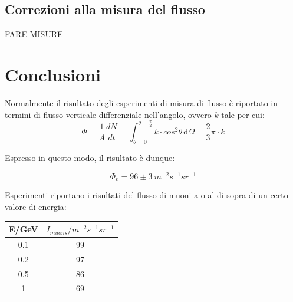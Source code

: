 \documentclass[11pt]{article}
\begin{document}
\begin{flushleft}
\subsection{Correzioni alla misura del flusso}
FARE MISURE

\section{Conclusioni}
Normalmente il risultato degli esperimenti di misura di flusso è riportato in termini di flusso verticale differenziale nell'angolo, ovvero $k$ tale per cui:
\begin{equation}
\Phi = \frac{1}{A}\frac{dN}{dt}=\int_{\theta=0}^{\theta=\frac{\pi}{2}}  \! k\cdot cos^2{\theta} \, \mathrm{d}\Omega = \frac{2}{3}\pi\cdot k
\end{equation}

Espresso in questo modo, il risultato è dunque:

\begin{equation}
\Phi_v = 96 \pm 3 \ m^{-2}s^{-1} sr^{-1}
\end{equation}





Esperimenti\cite{Flusso_NPL} riportano i risultati del flusso di muoni a o al di sopra di un certo valore di energia: \\
\vspace{0.8 cm}
\begin{tabular}{|c|c|}
\hline 
E/GeV & $I_{muons}/m^{-2} s^{-1} sr^{-1}$ \\ 
\hline 
0.1 & 99 \\ 
\hline 
0.2 & 97 \\ 
\hline 
0.5 & 86 \\ 
\hline 
1 & 69 \\ 
\hline 
\end{tabular} 
\vspace{0.8 cm}


\end{flushleft}
\end{document}
